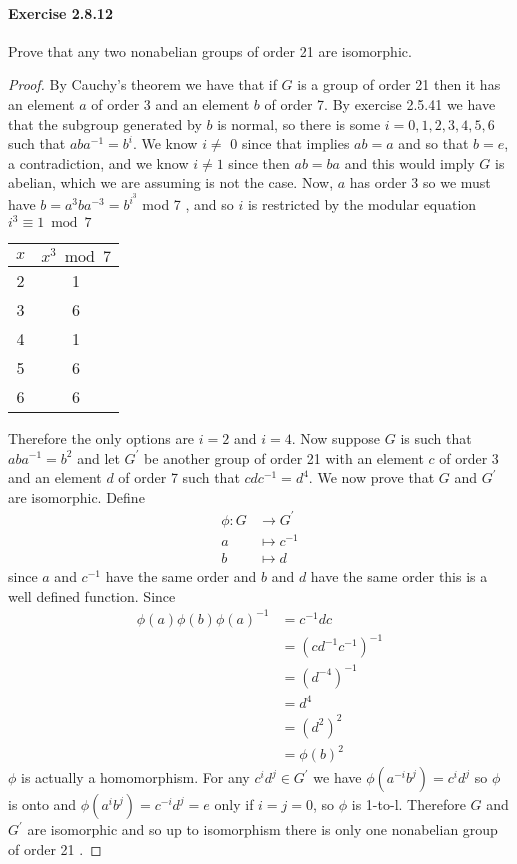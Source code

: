 \documentclass{article}
\begin{document}
\paragraph{Exercise 2.8.12} Prove that any two nonabelian groups of order 21 are isomorphic.
\begin{proof}
    By Cauchy's theorem we have that if $G$ is a group of order 21 then it has an element $a$ of order 3 and an element $b$ of order 7. By exercise 2.5.41 we have that the subgroup generated by $b$ is normal, so there is some $i=0,1,2,3,4,5,6$ such that $a b a^{-1}=b^i$. We know $i \neq$ 0 since that implies $a b=a$ and so that $b=e$, a contradiction, and we know $i \neq 1$ since then $a b=b a$ and this would imply $G$ is abelian, which we are assuming is not the case.
Now, $a$ has order 3 so we must have $b=a^3 b a^{-3}=b^{i^3}$ mod 7 , and so $i$ is restricted by the modular equation $i^3 \equiv 1 \bmod 7$
\begin{center}
\begin{tabular}{|c|c|}
\hline$x$ & $x^3 \bmod 7$ \\
\hline 2 & 1 \\
\hline 3 & 6 \\
\hline 4 & 1 \\
\hline 5 & 6 \\
\hline 6 & 6 \\
\hline
\end{tabular}
\end{center}
Therefore the only options are $i=2$ and $i=4$. Now suppose $G$ is such that $a b a^{-1}=b^2$ and let $G^{\prime}$ be another group of order 21 with an element $c$ of order 3 and an element $d$ of order 7 such that $c d c^{-1}=d^4$. We now prove that $G$ and $G^{\prime}$ are isomorphic. Define
$$
\begin{aligned}
\phi: G & \rightarrow G^{\prime} \\
a & \mapsto c^{-1} \\
b & \mapsto d
\end{aligned}
$$
since $a$ and $c^{-1}$ have the same order and $b$ and $d$ have the same order this is a well defined function. Since
$$
\begin{aligned}
\phi(a) \phi(b) \phi(a)^{-1} & =c^{-1} d c \\
& =\left(c d^{-1} c^{-1}\right)^{-1} \\
& =\left(d^{-4}\right)^{-1} \\
& =d^4 \\
& =\left(d^2\right)^2 \\
& =\phi(b)^2
\end{aligned}
$$
$\phi$ is actually a homomorphism. For any $c^i d^j \in G^{\prime}$ we have $\phi\left(a^{-i} b^j\right)=c^i d^j$ so $\phi$ is onto and $\phi\left(a^i b^j\right)=c^{-i} d^j=e$ only if $i=j=0$, so $\phi$ is 1-to-l. Therefore $G$ and $G^{\prime}$ are isomorphic and so up to isomorphism there is only one nonabelian group of order 21 .
\end{proof}
\end{document}

